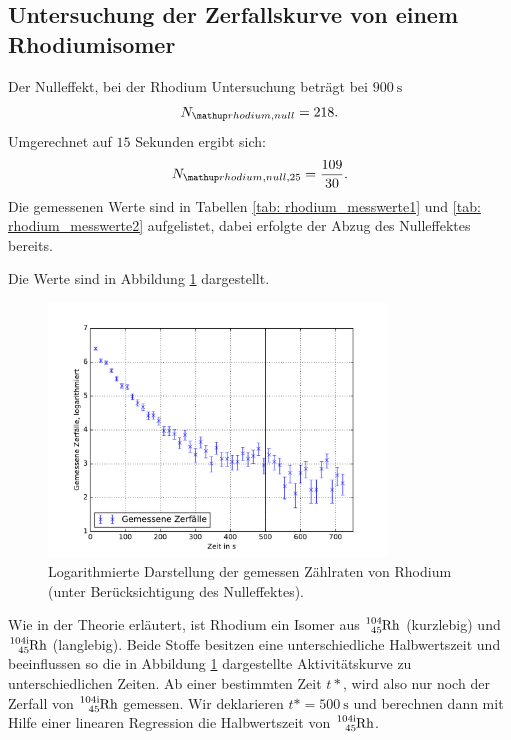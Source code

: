 \subsection{Untersuchung der Zerfallskurve von einem Rhodiumisomer}
Der Nulleffekt, bei der Rhodium Untersuchung beträgt bei $\SI{900}{\second}$
\begin{equation*}
  N\ua{rhodium,null}=218.
\end{equation*}
Umgerechnet auf $15$ Sekunden ergibt sich: %
\begin{equation*}
     N\ua{rhodium,null,25}=\frac{109}{30}.
\end{equation*}
Die gemessenen Werte sind in Tabellen \ref{tab: rhodium_messwerte1} und \ref{tab: rhodium_messwerte2} aufgelistet, dabei erfolgte %
der Abzug des Nulleffektes bereits.

Die Werte sind in Abbildung \ref{fig: plot_rhodium} dargestellt.
\begin{figure}
  \centering
  \includegraphics[width=0.8\textwidth]{pics/ra_all.pdf}
  \caption{Logarithmierte Darstellung der gemessen Zählraten von Rhodium (unter Berücksichtigung des Nulleffektes).}
  \label{fig: plot_rhodium}
\end{figure}
Wie in der Theorie erläutert, ist Rhodium ein Isomer aus $\ce{^{104}_{45} Rh}$ (kurzlebig) und %
$\ce{^{104i}_{45} Rh}$ (langlebig). Beide Stoffe besitzen eine unterschiedliche Halbwertszeit und
beeinflussen so die in Abbildung \ref{fig: plot_rhodium} dargestellte Aktivitätskurve zu unterschiedlichen
Zeiten.
Ab einer bestimmten Zeit $t*$, wird also nur noch der Zerfall von $\ce{^{104i}_{45} Rh}$
gemessen.
Wir deklarieren $t*=\SI{500}{\second}$ und berechnen dann mit Hilfe einer linearen Regression %
die Halbwertszeit von $\ce{^{104i}_{45} Rh}$.

